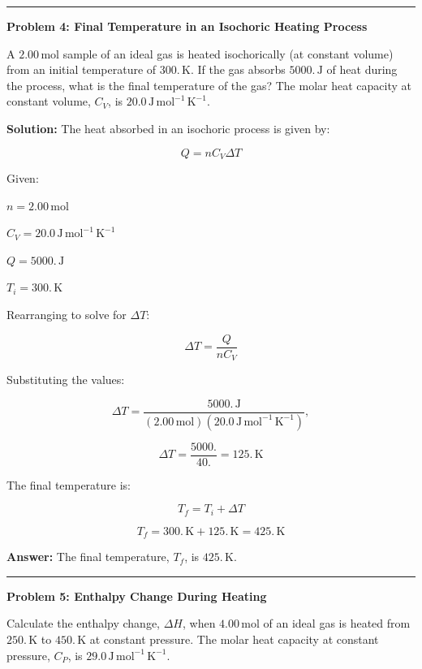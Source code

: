 \documentclass[
  9pt,
]{extbook}
\theoremstyle{definition}
\theoremstyle{definition}
\theoremstyle{definition}
\theoremstyle{definition}
\theoremstyle{remark}
\begin{document}
\begin{center}\rule{0.5\linewidth}{0.5pt}\end{center}

\textbf{Problem 4: Final Temperature in an Isochoric Heating Process}

A \(2.00 \, \text{mol}\) sample of an ideal gas is heated isochorically (at constant volume) from an initial temperature of \(300. \, \text{K}\). If the gas absorbs \(5000. \, \text{J}\) of heat during the process, what is the final temperature of the gas? The molar heat capacity at constant volume, \(C_V\), is \(20.0 \, \text{J} \, \text{mol}^{-1} \, \text{K}^{-1}\).

\textbf{Solution:} The heat absorbed in an isochoric process is given by:

\[Q = n C_V \Delta T\]

Given:

\(n = 2.00 \, \text{mol}\)

\(C_V = 20.0 \, \text{J} \, \text{mol}^{-1} \, \text{K}^{-1}\)

\(Q = 5000. \, \text{J}\)

\(T_i = 300. \, \text{K}\)

Rearranging to solve for \(\Delta T\):

\[\Delta T = \frac{Q}{n C_V}\]

Substituting the values:

\[\Delta T = \frac{5000. \, \text{J}}{(2.00\,\text{mol}) (20.0 \, \text{J} \, \text{mol}^{-1} \, \text{K}^{-1})},\]

\[\Delta T = \frac{5000.}{40.} = 125. \, \text{K}\]

The final temperature is:

\[T_f = T_i + \Delta T\]

\[T_f = 300. \, \text{K} + 125. \, \text{K} = 425. \, \text{K}\]

\textbf{Answer:} The final temperature, \(T_f\), is \(425. \, \text{K}\).

\begin{center}\rule{0.5\linewidth}{0.5pt}\end{center}

\textbf{Problem 5: Enthalpy Change During Heating}

Calculate the enthalpy change, \(\Delta H\), when \(4.00 \, \text{mol}\) of an ideal gas is heated from \(250. \, \text{K}\) to \(450. \, \text{K}\) at constant pressure. The molar heat capacity at constant pressure, \(C_P\), is \(29.0 \, \text{J} \, \text{mol}^{-1} \, \text{K}^{-1}\).
\end{document}
